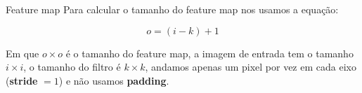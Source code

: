 \documentclass[10pt]{beamer}
\begin{document}


\begin{frame}{Feature map}
Para calcular o tamanho do feature map nos usamos a equação:

\begin{equation*}
 o = (i - k) +1
\end{equation*}


Em que $o \times o$ é o tamanho do feature map, a imagem de entrada tem o tamanho $i \times i$, o tamanho do filtro é $k \times k$, andamos apenas um pixel por vez em cada eixo (\textbf{stride} $= 1$) e não usamos \textbf{padding}.
\end{frame}

\end{document}
